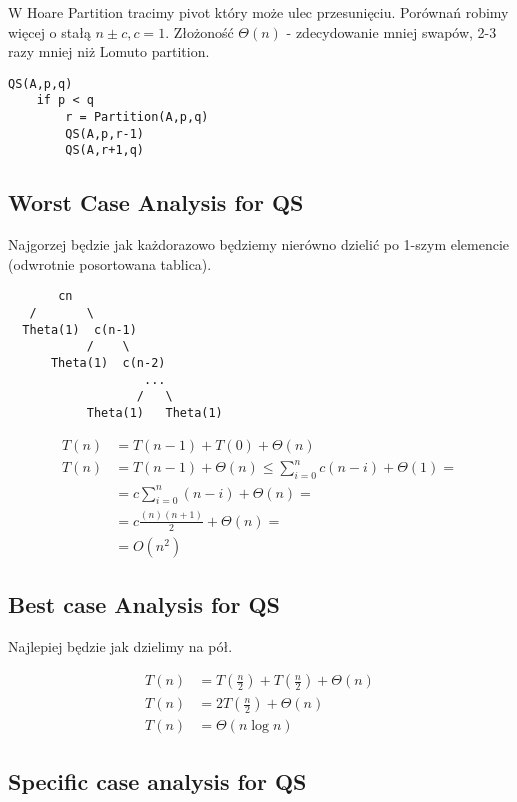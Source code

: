 \documentclass{article}
\numberwithin{equation}{subsection}
\begin{document}
W Hoare Partition tracimy pivot który może ulec przesunięciu. Porównań robimy więcej o stałą $n \pm c, c=1$. 
Złożoność $\Theta(n)$ - zdecydowanie mniej swapów, 2-3 razy mniej niż Lomuto partition.

\begin{verbatim}
QS(A,p,q)
    if p < q
        r = Partition(A,p,q)
        QS(A,p,r-1)
        QS(A,r+1,q)
\end{verbatim}

\subsection{Worst Case Analysis for QS}

Najgorzej będzie jak każdorazowo będziemy nierówno dzielić po 1-szym elemencie (odwrotnie posortowana tablica).

\begin{verbatim}
       cn
   /       \
  Theta(1)  c(n-1)
           /    \ 
      Theta(1)  c(n-2)
                   ...
                  /   \
           Theta(1)   Theta(1) 
\end{verbatim}

\begin{align}
    T(n) &= T(n-1) + T(0) + \Theta(n)\\
    T(n) &= T(n-1) + \Theta(n) \leq \sum_{i=0}^{n} c(n-i) + \Theta(1) = \\
    &= c\sum_{i=0}^{n} (n-i) + \Theta(n) =\\
    &= c \frac{(n)(n+1)}{2} + \Theta(n) =\\
    &= O(n^2)
\end{align}

\subsection{Best case Analysis for QS}

Najlepiej będzie jak dzielimy na pół.

\begin{align}
    T(n) &= T\left(\frac{n}{2}\right) + T\left(\frac{n}{2}\right) + \Theta(n) \\
    T(n) &= 2T\left(\frac{n}{2}\right) + \Theta(n) \\
    T(n) &= \Theta(n\log n)
\end{align}

\subsection{Specific case analysis for QS}
\end{document}
